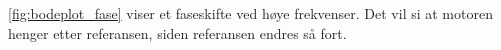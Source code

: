 \autoref{fig:bodeplot_fase} viser et faseskifte ved høye frekvenser. Det vil si at motoren henger etter referansen, siden referansen endres så fort.
























%     



%     

